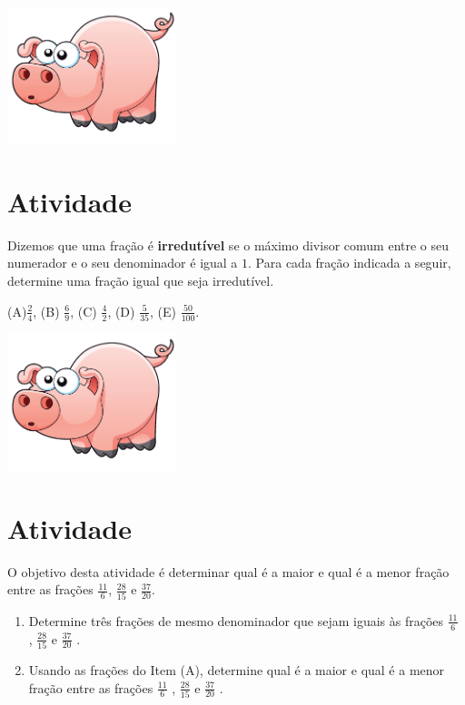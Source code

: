 \documentclass[a4,12pt]{book}
\newcounter{atividade}
\begin{document}
\includegraphics[width=\textwidth,height=4cm, keepaspectratio]{pig}
\section{Atividade}







Dizemos que uma fração é {\bf irredutível} se o máximo divisor comum entre o seu numerador e o seu denominador é igual a $1$. Para cada fração indicada a seguir, determine uma fração igual que seja irredutível.

(A)$\frac{2}{4}$, (B) $\frac{6}{9}$, (C) $\frac{4}{2}$, (D) $\frac{5}{35}$, (E) $\frac{50}{100}$.





\includegraphics[width=\textwidth,height=4cm, keepaspectratio]{pig}
\section{Atividade}







O objetivo desta atividade é determinar qual é a maior e qual é a menor fração entre
as frações $\frac{11}{6}$, $\frac{28}{15}$ e $\frac{37}{20}$.

\begin{enumerate} [\quad a)] %
  \item     Determine três frações de mesmo denominador que sejam iguais às frações     $\frac{11}{6}$    ,     $\frac{28}{15}$     e     $\frac{37}{20}$    .
  \item     Usando as frações do Item (A), determine qual é a maior e qual é a menor fração entre as frações     $\frac{11}{6}$    ,     $\frac{28}{15}$     e     $\frac{37}{20}$    .
\end{enumerate} %
\end{document}
